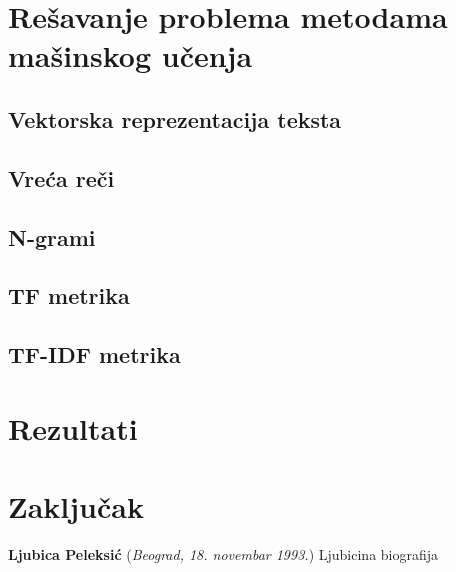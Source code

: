 \documentclass[12pt,oneside]{memoir}
\begin{document}
\chapter{Rešavanje problema metodama mašinskog učenja}

\section{Vektorska reprezentacija teksta}
\section{Vreća reči}
\section{N-grami}
\section{TF metrika}
\section{TF-IDF metrika}

\chapter{Rezultati}



\chapter{Zaključak}





% 
\literatura

\backmatter


\begin{biografija}
  \textbf{Ljubica Peleksić} (\emph{Beograd,
    18.  novembar 1993.}) 
	Ljubicina biografija
\end{biografija}
\end{document}
